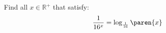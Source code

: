 Find all $x \in \mathbb{R}^{+}$ that satisfy:
\begin{equation*}
  \frac{1}{16^x}
  = \log_{\frac{1}{16}}\paren{x}
\end{equation*}
